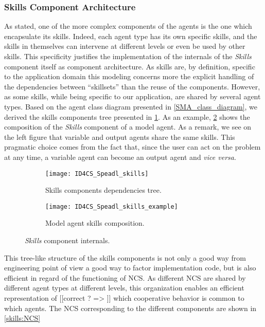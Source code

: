\subsubsection{Skills Component Architecture}\label{Skills_component_descr}

As stated, one of the more complex components of the agents is the one which encapsulate its skills. Indeed, each agent type has its own specific skills, and the skills in themselves can intervene at different levels or even be used by other skills. This specificity justifies the implementation of the internals of the \emph{Skills} component itself as component architecture. As skills are, by definition, specific to the application domain this modeling concerns more the explicit handling of the dependencies between \enquote{skillsets} than the reuse of the components. However, as some skills, while being specific to our application, are shared by several agent types. Based on the agent class diagram presented in \figurename{} \ref{SMA_class_diagram}, we derived the skills components tree presented in \figurename{} \ref{skills:graph}. As an example, \figurename{} \ref{skills:example} shows the composition of the \emph{Skills} component of a model agent.  As a remark, we see on the left figure that variable and output agents share the same skills. This pragmatic choice comes from the fact that, since the user can act on the problem at any time, a variable agent can become an output agent and \emph{vice versa}.

\begin{figure}[]
\centering
	\begin{subfigure}[b]{0.49\textwidth}
			\texttt{[image: ID4CS\_Speadl\_skills]}
			\caption{Skills components dependencies tree.}\label{skills:graph}
	\end{subfigure}
	\begin{subfigure}[b]{0.49\textwidth}
			\texttt{[image: ID4CS\_Speadl\_skills\_example]}
			\caption{Model agent skills composition.}\label{skills:example}
	\end{subfigure}
\caption{\emph{Skills} component internals.}\label{skills}
\end{figure}

This tree-like structure of the skills components is not only a good way from engineering point of view a good way to factor implementation code, but is also efficient in regard of the functioning of NCS. As different NCS are shared by different agent types at different levels, this organization enables an efficient representation of [[correct ? => ]] which cooperative behavior is common to which agents. The NCS corresponding to the different components are shown in \figurename{} \ref{skills:NCS}

